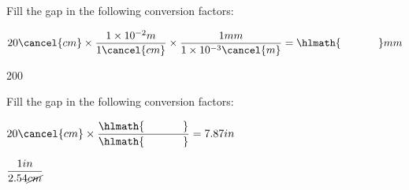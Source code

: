 \documentclass[main.tex]{subfiles}
\begin{document}
\begin{multicols*}{2}
\begin{question}[ID=\the\value{numA}]
Fill the gap in the following conversion factors:
\begin{center}$ 20\cancel{cm} \times \dfrac{1\times10^{-2}m}{1\cancel{cm}}   \times \dfrac{1mm}{1\times10^{-3}\cancel{m}}       =\hlmath{\hspace{35pt}}mm$\end{center}
\end{question}
\begin{solution}
200
\hspace{0.1cm}\end{solution}%



\begin{question}[ID=\the\value{numA}]
Fill the gap in the following conversion factors:
\begin{center}$20\cancel{cm} \times \dfrac{\hlmath{\hspace{35pt}}}{\hlmath{\hspace{35pt}}}=7.87in$\end{center}
\end{question}
\begin{solution}
$\dfrac{1 in}{2.54\cancel{cm}}$
\hspace{0.1cm}\end{solution}%



\end{multicols*}
\end{document}
